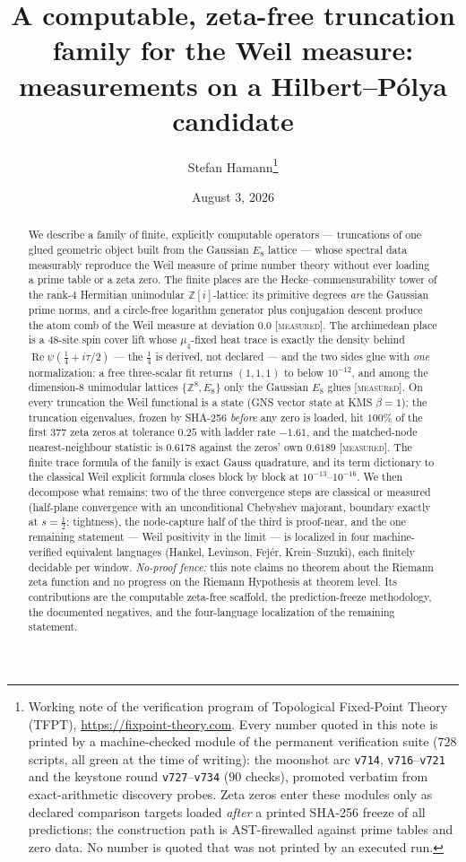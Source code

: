 \documentclass[11pt,a4paper]{article}
\title{A computable, zeta-free truncation family for the Weil
measure:\\ measurements on a Hilbert--P\'olya candidate}
\author{Stefan Hamann\thanks{Working note of the verification program
of Topological Fixed-Point Theory (TFPT),
\url{https://fixpoint-theory.com}.  Every number quoted in this note
is printed by a machine-checked module of the permanent verification
suite ($728$ scripts, all green at the time of writing): the moonshot
arc \texttt{v714}, \texttt{v716}--\texttt{v721} and the keystone
round \texttt{v727}--\texttt{v734} ($90$ checks), promoted verbatim
from exact-arithmetic discovery probes.  Zeta zeros enter these
modules only as declared comparison targets loaded \emph{after} a
printed SHA-256 freeze of all predictions; the construction path is
AST-firewalled against prime tables and zero data.  No number is
quoted that was not printed by an executed run.}}
\date{August 3, 2026}
\theoremstyle{remark}
\newcommand{\Z}{\mathbb Z}
\DeclareMathOperator{\Rey}{Re}
\newcommand{\MEASURED}{\textnormal{[\textsc{measured}]}}
\begin{document}
\maketitle

\begin{abstract}
We describe a family of finite, explicitly computable operators
--- truncations of one glued geometric object built from the Gaussian
$E_8$ lattice --- whose spectral data measurably reproduce the Weil
measure of prime number theory without ever loading a prime table or
a zeta zero.  The finite places are the Hecke--commensurability tower
of the rank-$4$ Hermitian unimodular $\Z[i]$-lattice: its primitive
degrees \emph{are} the Gaussian prime norms, and a circle-free
logarithm generator plus conjugation descent produce the atom comb of
the Weil measure at deviation $0.0$ \MEASURED.  The archimedean place
is a $48$-site spin cover lift whose $\mu_4$-fixed heat trace is
exactly the density behind
$\Rey\psi(\tfrac14+i\tau/2)$ --- the $\tfrac14$ is derived, not
declared --- and the two sides glue with \emph{one} normalization: a
free three-scalar fit returns $(1,1,1)$ to below $10^{-12}$, and
among the dimension-$8$ unimodular lattices $\{\Z^8,E_8\}$ only the
Gaussian $E_8$ glues \MEASURED.  On every truncation the Weil
functional is a state (GNS vector state at KMS $\beta=1$); the
truncation eigenvalues, frozen by SHA-256 \emph{before} any zero is
loaded, hit $100\%$ of the first $377$ zeta zeros at tolerance
$0.25$ with ladder rate $-1.61$, and the matched-node
nearest-neighbour statistic is $0.6178$ against the zeros' own
$0.6189$ \MEASURED.  The finite trace formula of the family is exact
Gauss quadrature, and its term dictionary to the classical Weil
explicit formula closes block by block at $10^{-13}$--$10^{-16}$.  We
then decompose what remains: two of the three convergence steps are
classical or measured (half-plane convergence with an unconditional
Chebyshev majorant, boundary exactly at $s=\tfrac12$; tightness), the
node-capture half of the third is proof-near, and the one remaining
statement --- Weil positivity in the limit --- is localized in four
machine-verified equivalent languages (Hankel, Levinson, Fej\'er,
Krein--Suzuki), each finitely decidable per window.
\emph{No-proof fence:} this note claims no theorem about the Riemann
zeta function and no progress on the Riemann Hypothesis at theorem
level.  Its contributions are the computable zeta-free scaffold, the
prediction-freeze methodology, the documented negatives, and the
four-language localization of the remaining statement.
\end{abstract}
\end{document}

